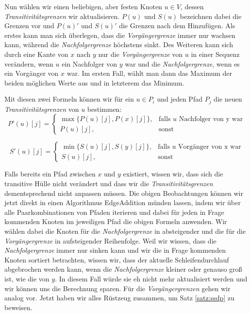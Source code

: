Nun wählen wir einen beliebigen, aber festen Knoten $u \in V$, dessen \emph{Transitivitätsgrenzen} wir aktualisieren. $P(u)$ und $S(u)$ bezeichnen dabei die Grenzen vor und $P(u)'$ und $S(u)'$ die Grenzen nach dem Hinzufügen. Als erstes kann man sich überlegen, dass die \emph{Vorgängergrenze} immer nur wachsen kann, während die \emph{Nachfolgergrenze} höchstens sinkt. Des Weiteren kann sich durch eine Kante von $x$ nach $y$ nur die \emph{Vorgängergrenze} von $u$ in einer Sequenz verändern, wenn $u$ ein Nachfolger von $y$ war und die \emph{Nachfolgergrenze}, wenn es ein Vorgänger von $x$ war. Im ersten Fall, wählt man dann das Maximum der beiden möglichen Werte aus und in letzterem das Minimum.  

Mit diesen zwei Formeln können wir für ein $u \in P_i$ und jeden Pfad $P_j$ die neuen \emph{Transitivitätsgrenzen} von $u$ bestimmen:
\begin{equation}
	P'(u)[j] = \begin{cases}
			\max\{P(u)[j], P(x)[j]\}, & \text{falls $u$ Nachfolger von y war} \\
			P(u)[j], & \text{sonst}
		\end{cases}
\end{equation} 

\begin{equation}
	S'(u)[j] = \begin{cases}
			\min\{S(u)[j], S(y)[j]\}, & \text{falls $u$ Vorgänger von x war} \\
			S(u)[j], & \text{sonst}
		\end{cases}
\end{equation}

Falls bereits ein Pfad zwischen $x$ und $y$ existiert, wissen wir, dass sich die transitive Hülle nicht verändert und dass wir die \emph{Transitivitätsgrenzen} dementsprechend nicht anpassen müssen. Die obigen Beobachtungen können wir jetzt direkt in einen Algorithmus \textrm{EdgeAddition} münden lassen, indem wir über alle Paarkombinationen von Pfaden iterieren und dabei für jeden in Frage kommenden Knoten im jeweiligen Pfad die obigen Formeln anwenden. Wir wählen dabei die Knoten für die \emph{Nachfolgergrenze} in absteigender und die für die \emph{Vorgängergrenze} in aufsteigender Reihenfolge. Weil wir wissen, dass die \emph{Nachfolgergrenze} immer nur sinken kann und wir die in Frage kommenden Knoten sortiert betrachten, wissen wir, dass der aktuelle Schleifendurchlauf abgebrochen werden kann, wenn die \emph{Nachfolgergrenze} kleiner oder genauso groß ist, wie die von $y$. In diesem Fall würde sie eh nicht mehr aktualisiert werden und wir können uns die Berechnung sparen. Für die \emph{Vorgängergrenzen} gehen wir analog vor. Jetzt haben wir alles Rüstzeug zusammen, um Satz \ref{satz:ssdp} zu beweisen.

